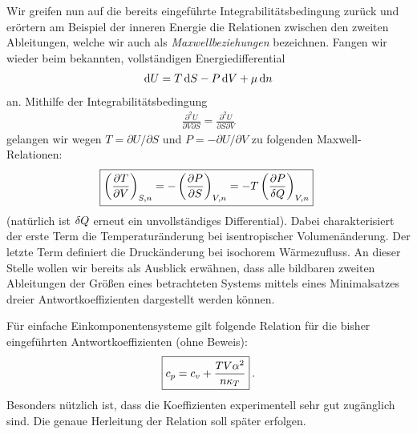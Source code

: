Wir greifen nun auf die bereits eingeführte Integrabilitätsbedingung zurück und erörtern am Beispiel der inneren Energie die Relationen zwischen den zweiten Ableitungen, welche wir auch als \emph{Maxwellbeziehungen} bezeichnen.
Fangen wir wieder beim bekannten, vollständigen Energiedifferential
\begin{align*}
    \mathop{}\!\mathrm{d} U = T\mathop{}\!\mathrm{d} S-P\mathop{}\!\mathrm{d} V+\mu \mathop{}\!\mathrm{d} n 
\end{align*}
an. Mithilfe der Integrabilitätsbedingung
\begin{align*}
    \frac{\partial^2U}{\partial V \partial S}=\frac{\partial^2U}{\partial S \partial V}
\end{align*}
gelangen wir wegen $T=\partial U/\partial S$ und $P=-\partial U/\partial V$ zu folgenden Maxwell-Relationen:
\begin{align*}
    \boxed{\left(\frac{\partial T}{\partial V}\right)_{S,n }=-\left(\frac{\partial P}{\partial S}\right)_{V,n }=-T\left(\frac{\partial P}{\mathop{}\!\delta Q}\right)_{V,n }}\;
\end{align*}
(natürlich ist $\mathop{}\!\delta Q$ erneut ein unvollständiges Differential). 
Dabei charakterisiert der erste Term die Temperaturänderung bei isentropischer Volumenänderung. Der letzte Term definiert die Druckänderung bei isochorem Wärmezufluss. An dieser Stelle wollen wir bereits als Ausblick erwähnen, dass alle bildbaren zweiten Ableitungen der Größen eines betrachteten Systems mittels eines Minimalsatzes dreier Antwortkoeffizienten dargestellt werden können.

Für einfache Einkomponentensysteme gilt folgende Relation für die bisher eingeführten Antwortkoeffizienten (ohne Beweis):
\begin{align*}
    \boxed{c_p=c_v+\frac{TV\alpha^2}{n \kappa_T}}\:.
\end{align*}
Besonders nützlich  ist, dass die Koeffizienten experimentell sehr gut zugänglich sind. Die genaue Herleitung der Relation soll später erfolgen.

